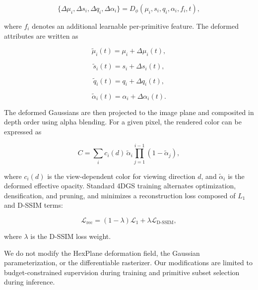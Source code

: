 \documentclass[pdflatex,sn-mathphys]{sn-jnl}
\begin{document}
\begin{equation}
\{\Delta \mu_i, \Delta s_i, \Delta q_i, \Delta \alpha_i\}
=
D_{\phi}(\mu_i, s_i, q_i, \alpha_i, f_i, t),
\label{eq:deformation}
\end{equation}

where $f_i$ denotes an additional learnable per-primitive feature. The deformed attributes are written as

\begin{equation}
\tilde{\mu}_i(t)=\mu_i+\Delta \mu_i(t),
\label{eq:mu}
\end{equation}

\begin{equation}
\tilde{s}_i(t)=s_i+\Delta s_i(t),
\label{eq:s}
\end{equation}

\begin{equation}
\tilde{q}_i(t)=q_i+\Delta q_i(t),
\label{eq:q}
\end{equation}

\begin{equation}
\tilde{\alpha}_i(t)=\alpha_i+\Delta \alpha_i(t).
\label{eq:alpha}
\end{equation}

The deformed Gaussians are then projected to the image plane and composited in depth order using alpha blending. For a given pixel, the rendered color can be expressed as

\begin{equation}
C =
\sum_i c_i(d)\,\tilde{\alpha}_i
\prod_{j=1}^{i-1}(1-\tilde{\alpha}_j),
\label{eq:rendering}
\end{equation}

where $c_i(d)$ is the view-dependent color for viewing direction $d$, and $\tilde{\alpha}_i$ is the deformed effective opacity. Standard 4DGS training alternates optimization, densification, and pruning, and minimizes a reconstruction loss composed of $L_1$ and D-SSIM terms:

\begin{equation}
\mathcal{L}_{\mathrm{rec}}
=
(1-\lambda)\mathcal{L}_1
+
\lambda\mathcal{L}_{\mathrm{D\text{-}SSIM}},
\label{eq:loss}
\end{equation}

where $\lambda$ is the D-SSIM loss weight.

We do not modify the HexPlane deformation field, the Gaussian parameterization, or the differentiable rasterizer. Our modifications are limited to budget-constrained supervision during training and primitive subset selection during inference.
\end{document}
